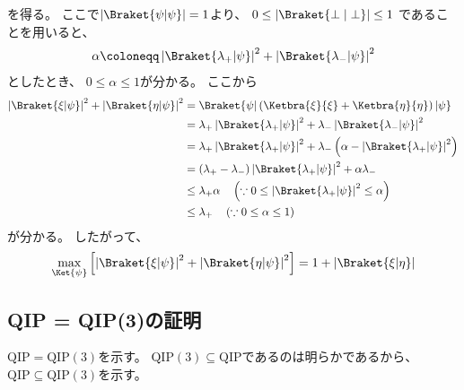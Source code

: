 \documentclass[a4paper, 10pt]{jsarticle}
\begin{document}
\begin{tcolorbox}[
enhanced,
colback = white,
boxrule = 0.5pt,
arc=2mm,
breakable
]
	を得る。
	ここで$\left| \Braket{\psi | \psi} \right| = 1$より、
	$0 \leq \left| \Braket{\perp | \perp} \right| \leq 1$
	であることを用いると、
	\begin{align}
		\alpha \coloneqq
		\left| \Braket{\lambda_+ | \psi} \right|^2
		+ \left| \Braket{\lambda_- | \psi} \right|^2
	\end{align}
	としたとき、
	$0 \leq \alpha \leq 1$が分かる。
	ここから
	\begin{align}
		\left| \Braket{\xi | \psi} \right|^2
		+ \left| \Braket{\eta | \psi} \right|^2
		&= \Braket{\psi |
		\left( \Ketbra{\xi}{\xi} + \Ketbra{\eta}{\eta} \right) |
		\psi} \\
		&= \lambda_+ \left| \Braket{\lambda_+ | \psi} \right|^2
		+ \lambda_- \left| \Braket{\lambda_- | \psi} \right|^2 \\
		&= \lambda_+ \left| \Braket{\lambda_+ | \psi} \right|^2
		+ \lambda_- \left( \alpha 
		- \left| \Braket{\lambda_+ | \psi} \right|^2 \right) \\
		&= \left( \lambda_+ - \lambda_- \right)
		\left| \Braket{\lambda_+ | \psi} \right|^2
		+ \alpha \lambda_- \\
		&\leq \lambda_+ \alpha \quad
		\left( \because 0 \leq
		\left| \Braket{\lambda_+ | \psi} \right|^2 \leq \alpha \right) \\
		&\leq \lambda_+ \quad \left( \because 0 \leq \alpha \leq 1 \right)
	\end{align}
	が分かる。
	したがって、
	\begin{align}
		\max_{\Ket{\psi}} \left[ \left| \Braket{\xi | \psi} \right|^2
		+ \left| \Braket{\eta | \psi} \right|^2 \right]
		= 1 + \left| \Braket{\xi | \eta} \right|
	\end{align}
\end{tcolorbox}

\subsection{QIP = QIP(3)の証明}
$\mathrm{QIP} = \mathrm{QIP}(3)$を示す。
$\mathrm{QIP}(3) \subseteq \mathrm{QIP}$であるのは明らかであるから、
$\mathrm{QIP} \subseteq \mathrm{QIP}(3)$を示す。
\end{document}
